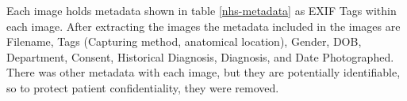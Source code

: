 
Each image holds metadata shown in table \ref{nhs-metadata} as EXIF Tags within each image. After extracting the images the metadata included in the images are Filename, Tags (Capturing method, anatomical location), Gender, DOB, Department, Consent, Historical Diagnosis, Diagnosis, and Date Photographed. There was other metadata with each image, but they are potentially identifiable, so to protect patient confidentiality, they were removed. 

